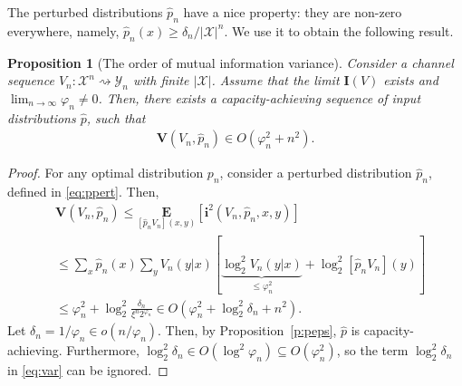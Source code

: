 \documentclass[journal, twocol]{IEEEtran}
\newcommand{\bfi}{{\mathbf{i}}}
\newcommand{\hp}{{\hat{p}}}
\newcommand{\bfE}{{\mathbf{E}}}
\newcommand{\bfI}{{\mathbf{I}}}
\newcommand{\bfV}{{\mathbf{V}}}
\newcommand{\mX}{{\mathcal{X}}}
\newcommand{\mY}{{\mathcal{Y}}}
\newcommand{\brsq}[1]{{\left[{#1}\right]}}
\newcommand{\vp}{\varphi}
\newcommand{\tosq}{\rightsquigarrow}
\newtheorem{proposition}{Proposition}
\newcommand{\pW}[2]{[{#1}{#2}]}
\newcommand{\pWyd}[2]{[{#1}{#2}]}
\begin{document}
\begin{appendices}
The perturbed distributions $\hp_n$ have a nice property: they are non-zero everywhere, namely, $\hp_n(x)\geq\delta_n/|\mX|^n$.
We use it to obtain the following result.
\begin{proposition}[The order of mutual information variance]
\label{p:pvar}
Consider a channel sequence $V_n:\mX^n\tosq\mY_n$ with finite $|\mX|$.
Assume that the limit $\bfI(V)$ exists and $\displaystyle\lim_{n\to\infty}\vp_n \neq 0$.
Then, there exists a capacity-achieving sequence of input distributions $\hp$, such that
\begin{align}
\bfV(V_n,\hp_n)\in O(\vp_n^2+n^2).
\label{eq:pertvar}
\end{align}
\end{proposition}
\begin{proof}
For any optimal distribution $p_n$, consider a perturbed distribution $\hp_n$, defined in \eqref{eq:ppert}.
Then,
\begin{align}
&\bfV(V_n,\hp_n)
\leq
\underset{\pW{\hp_n}{V_n}(x,y)}{\bfE}\brsq{\bfi^2(V_n,\hp_n,x,y)}
\nonumber \\&
\leq
\sum_{x}\hp_n(x) \sum_y V_n(y|x)\brsq{\underbrace{\log_2^2 V_n(y|x)}_{\leq \vp^2_n}+\log_2^2 \pWyd{\hp_n}{V_n}(y)}
\nonumber \\&
\leq 
\vp^2_n + \log_2^2\frac{\delta_n}{\xi^n 2^{\vp_n}} \in O(\vp_n^2+\log_2^2 \delta_n+n^2).
\label{eq:var}
\end{align}
Let $\delta_n=1/\vp_n \in o(n/\vp_n)$. 
Then, by Proposition~\ref{p:peps}, $\hp$ is capacity-achieving.
Furthermore, $\log_2^2\delta_n \in O(\log^2\vp_n) \subseteq O(\vp_n^2)$, so the term $\log_2^2\delta_n$ in \eqref{eq:var} can be ignored.
\end{proof}

\end{appendices}



\end{document}
